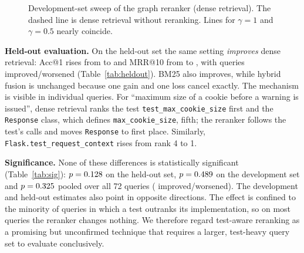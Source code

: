 \documentclass[conference]{IEEEtran}
\begin{document}
\begin{figure}[t]
\centering
{}
\caption{Development-set sweep of the graph reranker (dense retrieval). The
dashed line is dense retrieval without reranking. Lines for $\gamma=1$ and
$\gamma=0.5$ nearly coincide.}
\label{fig:sweep}
\end{figure}

\textbf{Held-out evaluation.} On the held-out set the same setting
\emph{improves} dense retrieval: Acc@1 rises from \HoDenseAcc{} to
\HoGDenseAcc{} and MRR@10 from \HoDenseMRR{} to \HoGDenseMRR{}, with \GHoWL{}
queries improved/worsened (Table~\ref{tab:heldout}). BM25 also improves, while
hybrid fusion is unchanged because one gain and one loss cancel exactly. The
mechanism is visible in individual queries. For ``maximum size of a cookie
before a warning is issued'', dense retrieval ranks the test
\texttt{test\_max\_cookie\_size} first and the \texttt{Response} class, which
defines \texttt{max\_cookie\_size}, fifth; the reranker follows the test's calls
and moves \texttt{Response} to first place. Similarly,
\texttt{Flask.test\_request\_context} rises from rank 4 to 1.

\textbf{Significance.} None of these differences is statistically significant
(Table~\ref{tab:sig}): $p = 0.128{}$ on the held-out set, $p = 0.489{}$ on the
development set and $p = 0.325{}$ pooled over all 72 queries (\GPoolWL{}
improved/worsened). The development and held-out estimates also point in
opposite directions. The effect is confined to the minority of queries in which
a test outranks its implementation, so on most queries the reranker changes
nothing. We therefore regard test-aware reranking as a promising but unconfirmed
technique that requires a larger, test-heavy query set to evaluate conclusively.
\end{document}
